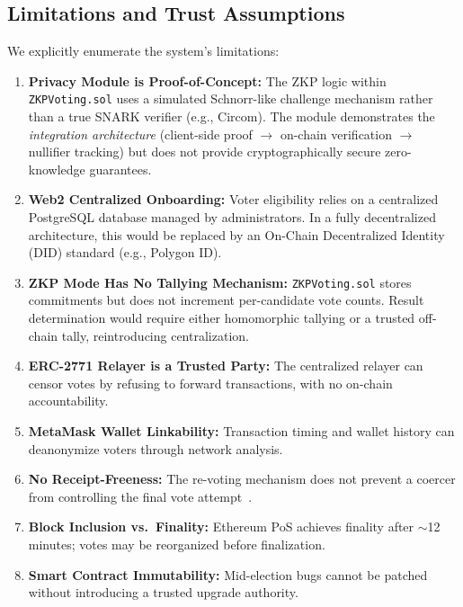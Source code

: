 \documentclass[conference]{IEEEtran}
\begin{document}
\subsection{Limitations and Trust Assumptions}
We explicitly enumerate the system's limitations:

\begin{enumerate}[leftmargin=*]
    \item \textbf{Privacy Module is Proof-of-Concept:} The ZKP logic within \texttt{ZKPVoting.sol} uses a simulated Schnorr-like challenge mechanism rather than a true SNARK verifier (e.g., Circom). The module demonstrates the \emph{integration architecture} (client-side proof $\rightarrow$ on-chain verification $\rightarrow$ nullifier tracking) but does not provide cryptographically secure zero-knowledge guarantees.

    \item \textbf{Web2 Centralized Onboarding:} Voter eligibility relies on a centralized PostgreSQL database managed by administrators. In a fully decentralized architecture, this would be replaced by an On-Chain Decentralized Identity (DID) standard (e.g., Polygon ID).

    \item \textbf{ZKP Mode Has No Tallying Mechanism:} \texttt{ZKPVoting.sol} stores commitments but does not increment per-candidate vote counts. Result determination would require either homomorphic tallying or a trusted off-chain tally, reintroducing centralization.

    \item \textbf{ERC-2771 Relayer is a Trusted Party:} The centralized relayer can censor votes by refusing to forward transactions, with no on-chain accountability.

    \item \textbf{MetaMask Wallet Linkability:} Transaction timing and wallet history can deanonymize voters through network analysis.

    \item \textbf{No Receipt-Freeness:} The re-voting mechanism does not prevent a coercer from controlling the final vote attempt~\cite{juels2005}.

    \item \textbf{Block Inclusion vs.\ Finality:} Ethereum PoS achieves finality after $\sim$12 minutes; votes may be reorganized before finalization.

    \item \textbf{Smart Contract Immutability:} Mid-election bugs cannot be patched without introducing a trusted upgrade authority.
\end{enumerate}
\end{document}
